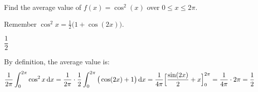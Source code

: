 \begin{question}[2000D]
 Find the average value of $f(x)=\cos^2(x)$ over $0\le x\le 2\pi$.
\end{question}

\begin{hint}
Remember $\cos^2 x = \frac{1}{2}\big(1+\cos(2x)\big)$.
\end{hint}

\begin{answer}
$\dfrac12$
\end{answer}

\begin{solution}
By definition, the average value is:
\begin{align*}
\frac{1}{2\pi}\int_0^{2\pi}\cos^2x\,\mathrm{d}x
=\frac{1}{2\pi}\cdot\frac{1}{2}\int_0^{2\pi}\big(\cos(2x)+1\big)\,\mathrm{d}x
=\frac{1}{4\pi}\Big[\frac{\sin(2x)}{2}+x\Big]_0^{2\pi}
=\frac{1}{4\pi}\cdot 2\pi
=\frac{1}{2}
\end{align*}

\end{solution}





